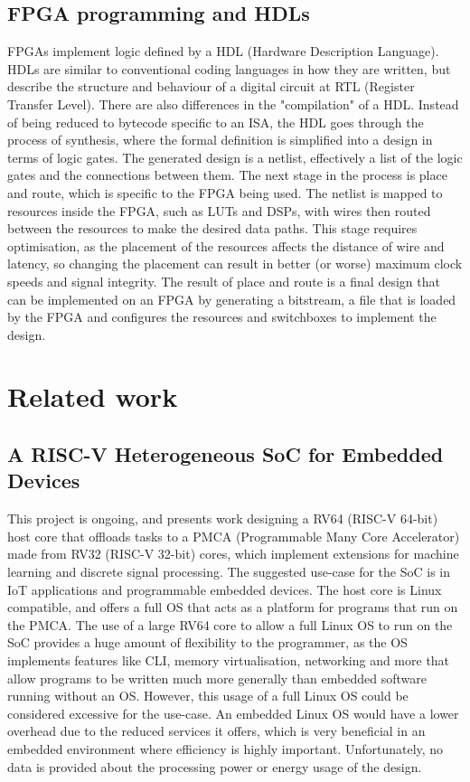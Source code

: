 \subsection{FPGA programming and HDLs}
FPGAs implement logic defined by a HDL (Hardware Description Language). HDLs are similar to conventional coding languages in how they are written, but describe the structure and behaviour of a digital circuit at RTL (Register Transfer Level). There are also differences in the "compilation" of a HDL. Instead of being reduced to bytecode specific to an ISA, the HDL goes through the process of synthesis, where the formal definition is simplified into a design in terms of logic gates. The generated design is a netlist, effectively a list of the logic gates and the connections between them. The next stage in the process is place and route, which is specific to the FPGA being used. The netlist is mapped to resources inside the FPGA, such as LUTs and DSPs, with wires then routed between the resources to make the desired data paths. This stage requires optimisation, as the placement of the resources affects the distance of wire and latency, so changing the placement can result in better (or worse) maximum clock speeds and signal integrity. The result of place and route is a final design that can be implemented on an FPGA by generating a bitstream, a file that is loaded by the FPGA and configures the resources and switchboxes to implement the design.

\section{Related work}
\subsection{A RISC-V Heterogeneous SoC for Embedded Devices\cite{valenterisc}}
This project is ongoing, and presents work designing a RV64 (RISC-V 64-bit) host core that offloads tasks to a PMCA (Programmable Many Core Accelerator) made from RV32 (RISC-V 32-bit) cores, which implement extensions for machine learning and discrete signal processing. The suggested use-case for the SoC is in IoT applications and programmable embedded devices. The host core is Linux compatible, and offers a full OS that acts as a platform for programs that run on the PMCA. The use of a large RV64 core to allow a full Linux OS to run on the SoC provides a huge amount of flexibility to the programmer, as the OS implements features like CLI, memory virtualisation, networking and more that allow programs to be written much more generally than embedded software running without an OS. However, this usage of a full Linux OS could be considered excessive for the use-case. An embedded Linux OS would have a lower overhead due to the reduced services it offers, which is very beneficial in an embedded environment where efficiency is highly important. Unfortunately, no data is provided about the processing power or energy usage of the design.

